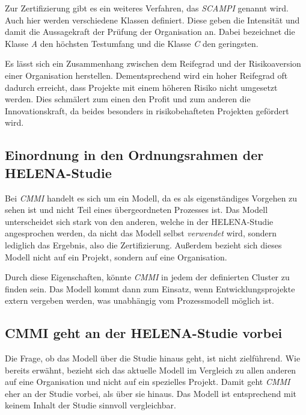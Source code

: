 Zur Zertifizierung gibt es ein weiteres Verfahren, das \textit{SCAMPI} genannt wird. Auch hier werden verschiedene Klassen definiert. Diese geben die Intensität und damit die Aussagekraft der Prüfung der Organisation an. Dabei bezeichnet die Klasse \textit{A} den höchsten Testumfang und die Klasse \textit{C} den geringsten.

Es lässt sich ein Zusammenhang zwischen dem Reifegrad und der Risikoaversion einer Organisation herstellen. Dementsprechend wird ein hoher Reifegrad oft dadurch erreicht, dass Projekte mit einem höheren Risiko nicht umgesetzt werden. Dies schmälert zum einen den Profit und zum anderen die Innovationskraft, da beides besonders in risikobehafteten Projekten gefördert wird.

\subsection{Einordnung in den Ordnungsrahmen der HELENA-Studie}
Bei \textit{CMMI} handelt es sich um ein Modell, da es als eigenständiges Vorgehen zu sehen ist und nicht Teil eines übergeordneten Prozesses ist. Das Modell unterscheidet sich stark von den anderen, welche in der HELENA-Studie angesprochen werden, da nicht das Modell selbst \textit{verwendet} wird, sondern lediglich das Ergebnis, also die Zertifizierung. Außerdem bezieht sich dieses Modell nicht auf ein Projekt, sondern auf eine Organisation.

Durch diese Eigenschaften, könnte \textit{CMMI} in jedem der definierten Cluster zu finden sein. Das Modell kommt dann zum Einsatz, wenn Entwicklungsprojekte extern vergeben werden, was unabhängig vom Prozessmodell möglich ist.

\subsection{CMMI geht an der HELENA-Studie vorbei}
Die Frage, ob das Modell über die Studie hinaus geht, ist nicht zielführend. Wie bereits erwähnt, bezieht sich das aktuelle Modell im Vergleich zu allen anderen auf eine Organisation und nicht auf ein spezielles Projekt. Damit geht \textit{CMMI} eher an der Studie vorbei, als über sie hinaus. Das Modell ist entsprechend mit keinem Inhalt der Studie sinnvoll vergleichbar.